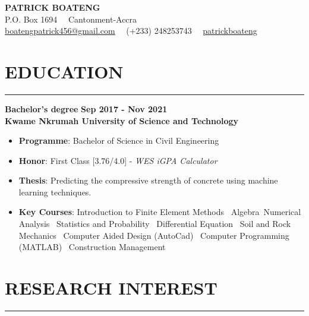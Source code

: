 \documentclass[letterpaper, 11pt]{article}
\newcommand{\cvsection}[1]{
	\section*{#1} \vspace*{-0.8cm}%
	\rule{\linewidth}{1.5pt}\par
}
\newcommand{\verticalSpace}{4pt}
\begin{document}

\begin{center}

	{\huge{\textbf{PATRICK BOATENG}}} \\ [\verticalSpace]

	P.O. Box 1694 \, \vrule \, Cantonment-Accra \\ [\verticalSpace]

	\faEnvelope \space
    \href{mailto:boatengpatrick456@gmail.com}{\underline{boatengpatrick456@gmail.com}}
	\, \vrule \,
	\faPhone \space (+233) 248253743
	\, \vrule \,
	\faGithub \space
    \href{https://www.github.com/patrickboateng}{\underline{patrickboateng}}

\end{center}


\cvsection{EDUCATION}

\textbf{Bachelor's degree} \hfill \textbf{Sep 2017 - Nov 2021} \\ [\verticalSpace]
\textbf{Kwame Nkrumah University of Science and Technology}

\begin{itemize}[leftmargin=*]

	\item \textbf{Programme}: Bachelor of Science in Civil Engineering
	\item \textbf{Honor}: First Class [3.76/4.0] - \textit{WES iGPA Calculator}
	\item \textbf{Thesis}: Predicting the compressive strength of concrete using machine
    learning techniques.
	\item \textbf{Key Courses}: Introduction to Finite Element Methods \vrule \, Algebra
    \vrule \,Numerical Analysis \vrule \, Statistics and Probability \vrule \,
     Differential Equation \vrule \, Soil and Rock Mechanics \vrule \, Computer Aided
     Design (AutoCad) \vrule \, Computer Programming (MATLAB) \vrule \, Construction
     Management

\end{itemize}


\cvsection{RESEARCH INTEREST}
\end{document}
